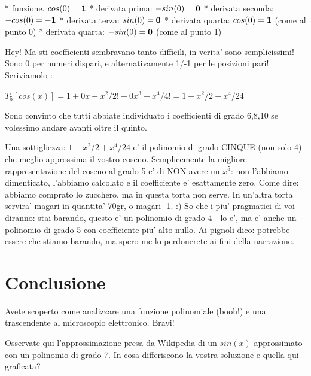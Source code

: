 * funzione. $ cos(0) = \bf{1}$
* derivata prima: $ -sin(0) = \bf{0}$
* derivata seconda: $ -cos(0) = \bf{-1}$
* derivata terza: $ sin(0) = \bf{0}$
* derivata quarta:  $ cos(0) = \bf{1}$ (come al punto 0)
* derivata quarta: $ -sin(0) = \bf{0}$ (come al punto 1)

Hey! Ma sti coefficienti sembravano tanto difficili, in verita' sono semplicissimi! Sono 0 per numeri dispari, e alternativamente 1/-1 per le posizioni pari!
Scriviamolo \acazzodicane : 


$ T_5[cos(x)] = 1 +0x - x^2/2! + 0x^3 + x^4/4! = 1 - x^2/2 + x^4/24 $


Sono convinto che tutti abbiate individuato i coefficienti di grado 6,8,10 se volessimo andare avanti oltre il quinto.

Una sottigliezza: $1 - x^2/2 + x^4/24 $ e' il polinomio di grado CINQUE (non solo 4) che meglio approssima il vostro coseno. Semplicemente 
la migliore rappresentazione del coseno al grado 5 e' di NON avere un $x^5$: non l'abbiamo dimenticato, l'abbiamo calcolato e il coefficiente 
e' esattamente zero. Come dire: abbiamo comprato lo zucchero, ma in questa torta non serve. In un'altra torta servira' magari in quantita' 70gr,
o magari -1. :) So che i piu' pragmatici di voi diranno: stai barando, questo e' un polinomio di grado 4 - lo e', ma e' anche un polinomio di
grado 5 con coefficiente piu' alto nullo. Ai pignoli dico: potrebbe essere che stiamo barando, ma spero me lo perdonerete ai fini della narrazione. 

\section{Conclusione}

Avete scoperto come analizzare una funzione polinomiale (booh!) e una trascendente al microscopio elettronico. Bravi!


Osservate qui l'approssimazione presa da Wikipedia di un $sin(x)$ approssimato con un polinomio di grado 7. In cosa differiscono la vostra soluzione
e quella qui graficata?

